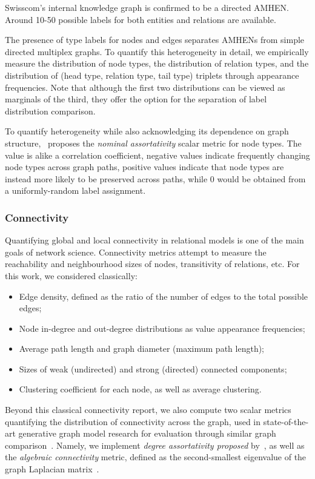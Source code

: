 Swisscom's internal knowledge graph is confirmed to be a directed AMHEN. Around 10-50 possible labels for both entities and relations are available. 
 
The presence of type labels for nodes and edges separates AMHENs from simple directed multiplex graphs. To quantify this heterogeneity in detail, we empirically measure the distribution of node types, the distribution of relation types, and the distribution of (head type, relation type, tail type) triplets through appearance frequencies. Note that although the first two distributions can be viewed as marginals of the third, they offer the option for the separation of label distribution comparison. 

To quantify heterogeneity while also acknowledging its dependence on graph structure,~\cite{newman_mixing_2003} proposes the \emph{nominal assortativity} scalar metric for node types. The value is alike a correlation coefficient, negative values indicate frequently changing node types across graph paths, positive values indicate that node types are instead more likely to be preserved across paths, while 0 would be obtained from a uniformly-random label assignment.

\subsubsection{Connectivity}

Quantifying global and local connectivity in relational models is one of the main goals of network science. Connectivity metrics attempt to measure the reachability and neighbourhood sizes of nodes, transitivity of relations, etc. For this work, we considered classically:
\begin{itemize}
    \item Edge density, defined as the ratio of the number of edges to the total possible edges;
    \item Node in-degree and out-degree distributions as value appearance frequencies;
    \item Average path length and graph diameter (maximum path length);
    \item Sizes of weak (undirected) and strong (directed) connected components;
    \item Clustering coefficient for each node, as well as average clustering.
\end{itemize}

Beyond this classical connectivity report, we also compute two scalar metrics quantifying the distribution of connectivity across the graph, used in state-of-the-art generative graph model research for evaluation through similar graph comparison~\cite{krawczuk_gg-gan_2020}. Namely, we implement \emph{degree assortativity proposed} by~\cite{newman_mixing_2003}, as well as the \emph{algebraic connectivity} metric, defined as the second-smallest eigenvalue of the graph Laplacian matrix~\cite{chung_spectral_1996}.

